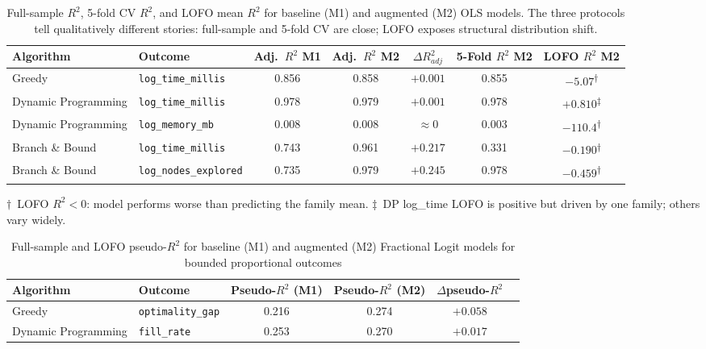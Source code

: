 \documentclass[sigconf]{acmart}
\begin{document}
\begin{table}[t]
\centering
\caption{Full-sample $R^2$, 5-fold CV $R^2$, and LOFO mean $R^2$ for baseline (M1) and augmented (M2) OLS models. The three protocols tell qualitatively different stories: full-sample and 5-fold CV are close; LOFO exposes structural distribution shift.}
\label{tab:ols_metrics}
\begin{tabular}{llccccc}
\toprule
\textbf{Algorithm} & \textbf{Outcome} & \textbf{Adj.~$R^2$ M1} & \textbf{Adj.~$R^2$ M2} & \textbf{$\Delta R^2_{adj}$} & \textbf{5-Fold $R^2$ M2} & \textbf{LOFO $R^2$ M2} \\
\midrule
Greedy & \texttt{log\_time\_millis} & 0.856 & 0.858 & $+0.001$ & 0.855 & $-5.07$\textsuperscript{$\dagger$} \\
Dynamic Programming & \texttt{log\_time\_millis} & 0.978 & 0.979 & $+0.001$ & 0.978 & $+0.810$\textsuperscript{$\ddagger$} \\
Dynamic Programming & \texttt{log\_memory\_mb} & 0.008 & 0.008 & $\approx 0$ & 0.003 & $-110.4$\textsuperscript{$\dagger$} \\
Branch \& Bound & \texttt{log\_time\_millis} & 0.743 & 0.961 & $+0.217$ & 0.331 & $-0.190$\textsuperscript{$\dagger$} \\
Branch \& Bound & \texttt{log\_nodes\_explored} & 0.735 & 0.979 & $+0.245$ & 0.978 & $-0.459$\textsuperscript{$\dagger$} \\
\bottomrule
\end{tabular}
{\small $\dagger$~LOFO $R^2 < 0$: model performs worse than predicting the family mean. $\ddagger$~DP log\_time LOFO is positive but driven by one family; others vary widely.}
\end{table}

\begin{table}[t]
\centering
\caption{Full-sample and LOFO pseudo-$R^2$ for baseline (M1) and augmented (M2) Fractional Logit models for bounded proportional outcomes}
\label{tab:flogit_metrics}
\begin{tabular}{llcccc}
\toprule
\textbf{Algorithm} & \textbf{Outcome} & \textbf{Pseudo-$R^2$ (M1)} & \textbf{Pseudo-$R^2$ (M2)} & \textbf{$\Delta$pseudo-$R^2$} \\
\midrule
Greedy & \texttt{optimality\_gap} & 0.216 & 0.274 & $+0.058$ \\
Dynamic Programming & \texttt{fill\_rate} & 0.253 & 0.270 & $+0.017$ \\
\bottomrule
\end{tabular}
\end{table}
\end{document}
